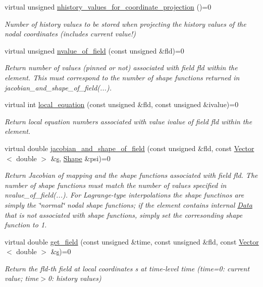 \begin{DoxyCompactItemize}
virtual unsigned \hyperlink{classoomph_1_1ProjectableElementBase_ab4ecd0cd24000a3ed675dc7198203c1f}{nhistory\+\_\+values\+\_\+for\+\_\+coordinate\+\_\+projection} ()=0
\begin{DoxyCompactList}\small\item\em Number of history values to be stored when projecting the history values of the nodal coordinates (includes current value!) \end{DoxyCompactList}\item 
virtual unsigned \hyperlink{classoomph_1_1ProjectableElementBase_a1a9a6de16f3511bca8e8be770abb9c2e}{nvalue\+\_\+of\+\_\+field} (const unsigned \&fld)=0
\begin{DoxyCompactList}\small\item\em Return number of values (pinned or not) associated with field fld within the element. This must correspond to the number of shape functions returned in jacobian\+\_\+and\+\_\+shape\+\_\+of\+\_\+field(...). \end{DoxyCompactList}\item 
virtual int \hyperlink{classoomph_1_1ProjectableElementBase_ac5c27ae929ff636dc7747fe23fd4f738}{local\+\_\+equation} (const unsigned \&fld, const unsigned \&ivalue)=0
\begin{DoxyCompactList}\small\item\em Return local equation numbers associated with value ivalue of field fld within the element. \end{DoxyCompactList}\item 
virtual double \hyperlink{classoomph_1_1ProjectableElementBase_ad45c21b58c0985d52f68ab2d79cbb488}{jacobian\+\_\+and\+\_\+shape\+\_\+of\+\_\+field} (const unsigned \&fld, const \hyperlink{classoomph_1_1Vector}{Vector}$<$ double $>$ \&\hyperlink{cfortran_8h_ab7123126e4885ef647dd9c6e3807a21c}{s}, \hyperlink{classoomph_1_1Shape}{Shape} \&psi)=0
\begin{DoxyCompactList}\small\item\em Return Jacobian of mapping and the shape functions associated with field fld. The number of shape functions must match the number of values specified in nvalue\+\_\+of\+\_\+field(...). For Lagrange-\/type interpolations the shape functinos are simply the \char`\"{}normal\char`\"{} nodal shape functions; if the element contains internal \hyperlink{classoomph_1_1Data}{Data} that is not associated with shape functions, simply set the corresonding shape function to 1. \end{DoxyCompactList}\item 
virtual double \hyperlink{classoomph_1_1ProjectableElementBase_ae4da5b565b6d333be2f5920f7be763cd}{get\+\_\+field} (const unsigned \&time, const unsigned \&fld, const \hyperlink{classoomph_1_1Vector}{Vector}$<$ double $>$ \&\hyperlink{cfortran_8h_ab7123126e4885ef647dd9c6e3807a21c}{s})=0
\begin{DoxyCompactList}\small\item\em Return the fld-\/th field at local coordinates s at time-\/level time (time=0\+: current value; time$>$0\+: history values) \end{DoxyCompactList}\end{DoxyCompactItemize}
